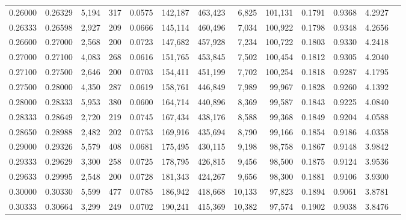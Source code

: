 \begin{tabular}{rrrrrrrrrrrrr}
0.26000 & 0.26329 & 5,194 & 317 &                                     0.0575 & 142,187 & 463,423 &   6,825 & 101,131 & 0.1791 & 0.9368 & 4.2927 \\
0.26333 & 0.26598 & 2,927 & 209 &                                     0.0666 & 145,114 & 460,496 &   7,034 & 100,922 & 0.1798 & 0.9348 & 4.2656 \\
0.26600 & 0.27000 & 2,568 & 200 &                                     0.0723 & 147,682 & 457,928 &   7,234 & 100,722 & 0.1803 & 0.9330 & 4.2418 \\
0.27000 & 0.27100 & 4,083 & 268 &                                     0.0616 & 151,765 & 453,845 &   7,502 & 100,454 & 0.1812 & 0.9305 & 4.2040 \\
0.27100 & 0.27500 & 2,646 & 200 &                                     0.0703 & 154,411 & 451,199 &   7,702 & 100,254 & 0.1818 & 0.9287 & 4.1795 \\
0.27500 & 0.28000 & 4,350 & 287 &                                     0.0619 & 158,761 & 446,849 &   7,989 &  99,967 & 0.1828 & 0.9260 & 4.1392 \\
0.28000 & 0.28333 & 5,953 & 380 &                                     0.0600 & 164,714 & 440,896 &   8,369 &  99,587 & 0.1843 & 0.9225 & 4.0840 \\
0.28333 & 0.28649 & 2,720 & 219 &                                     0.0745 & 167,434 & 438,176 &   8,588 &  99,368 & 0.1849 & 0.9204 & 4.0588 \\
0.28650 & 0.28988 & 2,482 & 202 &                                     0.0753 & 169,916 & 435,694 &   8,790 &  99,166 & 0.1854 & 0.9186 & 4.0358 \\
0.29000 & 0.29326 & 5,579 & 408 &                                     0.0681 & 175,495 & 430,115 &   9,198 &  98,758 & 0.1867 & 0.9148 & 3.9842 \\
0.29333 & 0.29629 & 3,300 & 258 &                                     0.0725 & 178,795 & 426,815 &   9,456 &  98,500 & 0.1875 & 0.9124 & 3.9536 \\
0.29633 & 0.29995 & 2,548 & 200 &                                     0.0728 & 181,343 & 424,267 &   9,656 &  98,300 & 0.1881 & 0.9106 & 3.9300 \\
0.30000 & 0.30330 & 5,599 & 477 &                                     0.0785 & 186,942 & 418,668 &  10,133 &  97,823 & 0.1894 & 0.9061 & 3.8781 \\
0.30333 & 0.30664 & 3,299 & 249 &                                     0.0702 & 190,241 & 415,369 &  10,382 &  97,574 & 0.1902 & 0.9038 & 3.8476 \\

\end{tabular}

